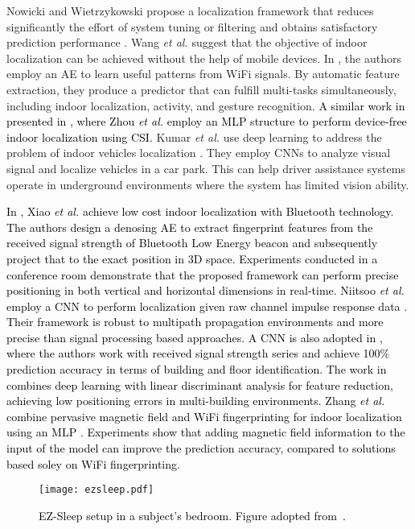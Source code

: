 \documentclass[journal,comsoc,letter]{IEEEtran}
\newcommand{\rev}[1]{\textcolor{black}{#1}}
\begin{document}
Nowicki and Wietrzykowski propose a localization framework that reduces significantly the effort of system tuning or filtering and obtains satisfactory prediction performance \cite{nowicki2017low}. Wang \emph{et al.} suggest that the objective of indoor localization can be achieved without the help of mobile devices. In \cite{wang2017device}, the authors employ an AE to learn useful patterns from WiFi signals. By automatic feature extraction, they produce a predictor that can fulfill multi-tasks simultaneously, including indoor localization, activity, and gesture recognition. \rev{A similar work in presented in \cite{zhou2018device}, where Zhou \emph{et al.} employ an MLP structure to perform device-free indoor localization using CSI.} Kumar \emph{et al.} use deep learning to address the problem of indoor vehicles localization \cite{kumar2016indoor}. They employ CNNs to analyze visual signal and localize vehicles in a car park. This can help driver assistance systems operate in underground environments where the system has limited vision ability. 

\rev{In \cite{xiao20173}, Xiao \emph{et al.} achieve low cost indoor localization with Bluetooth technology. The authors design a denosing AE to extract fingerprint features from the received signal strength of Bluetooth Low Energy beacon and subsequently project that to the exact position in 3D space. Experiments conducted in a conference room demonstrate that the proposed framework can perform precise positioning in both vertical and horizontal dimensions in real-time. Niitsoo \emph{et al.} employ a CNN to perform localization given raw channel impulse response data \cite{niitsoo2018convolutional}. Their framework is robust to multipath propagation environments and more precise than signal processing based approaches. A CNN is also adopted in \cite{ibrahim2018cnn}, where the authors work with received signal strength series and achieve 100\% prediction accuracy in terms of building and floor identification. The work in \cite{adege2018applying} combines deep learning with linear discriminant analysis for feature reduction, achieving low positioning errors in multi-building environments. Zhang \emph{et al.} combine pervasive magnetic field and WiFi fingerprinting for indoor localization using an MLP \cite{zhang2017deeppositioning}. Experiments show that adding magnetic field information to the input of the model can improve the prediction accuracy, compared to solutions based soley on WiFi fingerprinting.}

\begin{figure}[t]
\begin{center}
\texttt{[image: ezsleep.pdf]}
\caption{\label{fig:ezsleep} \rev{EZ-Sleep setup in a subject's bedroom. Figure adopted from~\cite{Hsu:2017:ZIS:3139486.3130924}.}}
\end{center}
\end{figure}
\end{document}
